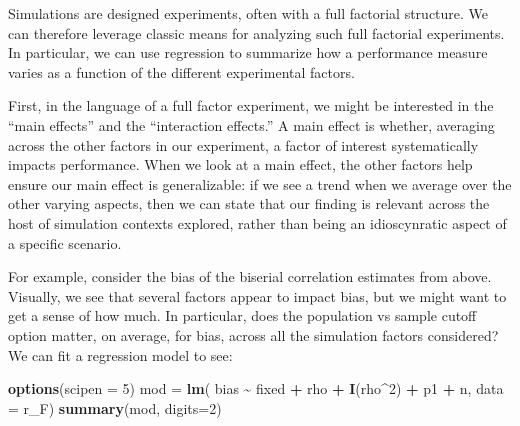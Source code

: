 \documentclass[
]{book}
\newenvironment{Shaded}{\begin{snugshade}}{\end{snugshade}}
\newcommand{\AttributeTok}[1]{\textcolor[rgb]{0.13,0.29,0.53}{#1}}
\newcommand{\DecValTok}[1]{\textcolor[rgb]{0.00,0.00,0.81}{#1}}
\newcommand{\FunctionTok}[1]{\textcolor[rgb]{0.13,0.29,0.53}{\textbf{#1}}}
\newcommand{\NormalTok}[1]{#1}
\newcommand{\OtherTok}[1]{\textcolor[rgb]{0.56,0.35,0.01}{#1}}
\newcommand{\SpecialCharTok}[1]{\textcolor[rgb]{0.81,0.36,0.00}{\textbf{#1}}}
\begin{document}
Simulations are designed experiments, often with a full factorial structure.
We can therefore leverage classic means for analyzing such full factorial experiments.
In particular, we can use regression to summarize how a performance measure varies as a function of the different experimental factors.

First, in the language of a full factor experiment, we might be interested in the ``main effects'' and the ``interaction effects.''
A main effect is whether, averaging across the other factors in our experiment, a factor of interest systematically impacts performance.
When we look at a main effect, the other factors help ensure our main effect is generalizable: if we see a trend when we average over the other varying aspects, then we can state that our finding is relevant across the host of simulation contexts explored, rather than being an idioscynratic aspect of a specific scenario.

For example, consider the bias of the biserial correlation estimates from above.
Visually, we see that several factors appear to impact bias, but we might want to get a sense of how much.
In particular, does the population vs sample cutoff option matter, on average, for bias, across all the simulation factors considered?
We can fit a regression model to see:

\begin{Shaded}
\begin{Highlighting}[]
\FunctionTok{options}\NormalTok{(}\AttributeTok{scipen =} \DecValTok{5}\NormalTok{)}
\NormalTok{mod }\OtherTok{=} \FunctionTok{lm}\NormalTok{( bias }\SpecialCharTok{\textasciitilde{}}\NormalTok{ fixed }\SpecialCharTok{+}\NormalTok{ rho }\SpecialCharTok{+} \FunctionTok{I}\NormalTok{(rho}\SpecialCharTok{\^{}}\DecValTok{2}\NormalTok{) }\SpecialCharTok{+}\NormalTok{ p1 }\SpecialCharTok{+}\NormalTok{ n, }\AttributeTok{data =}\NormalTok{ r\_F)}
\FunctionTok{summary}\NormalTok{(mod, }\AttributeTok{digits=}\DecValTok{2}\NormalTok{)}
\end{Highlighting}
\end{Shaded}
\end{document}

